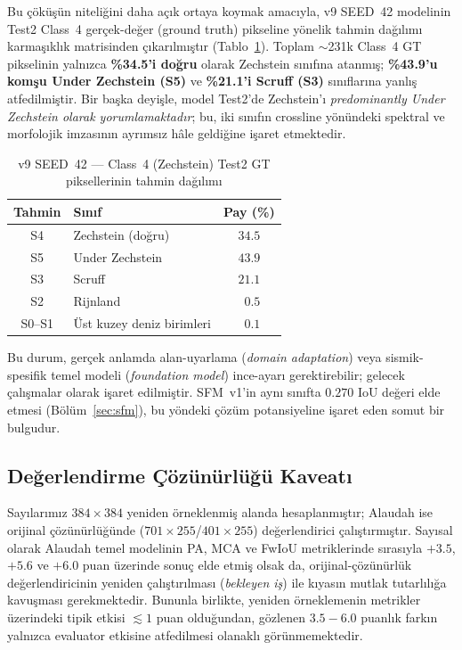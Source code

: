 \documentclass[conference,a4paper,10pt]{IEEEtran}
\begin{document}
Bu çöküşün niteliğini daha açık ortaya koymak amacıyla, v9 SEED~42 modelinin
Test2 Class~4 gerçek-değer (ground truth) pikseline yönelik tahmin dağılımı
karmaşıklık matrisinden çıkarılmıştır (Tablo~\ref{tab:c4_confusion}). Toplam
$\sim$231k Class~4 GT pikselinin yalnızca \textbf{\%34.5'i doğru} olarak
Zechstein sınıfına atanmış; \textbf{\%43.9'u komşu Under Zechstein (S5)}
ve \textbf{\%21.1'i Scruff (S3)} sınıflarına yanlış atfedilmiştir. Bir başka
deyişle, model Test2'de Zechstein'ı \emph{predominantly Under Zechstein
olarak yorumlamaktadır}; bu, iki sınıfın crossline yönündeki spektral ve
morfolojik imzasının ayrımsız hâle geldiğine işaret etmektedir.

\begin{table}[!t]
\renewcommand{\arraystretch}{1.2}
\caption{v9 SEED~42 --- Class~4 (Zechstein) Test2 GT piksellerinin tahmin dağılımı}
\label{tab:c4_confusion}
\centering
\begin{tabular}{clc}
\toprule
\textbf{Tahmin} & \textbf{Sınıf} & \textbf{Pay (\%)} \\
\midrule
\rowcolor{green!10}
S4 & Zechstein (doğru)       & $\mathbf{34.5}$ \\
S5 & Under Zechstein         & $43.9$ \\
S3 & Scruff                  & $21.1$ \\
S2 & Rijnland                & $\phantom{0}0.5$ \\
S0--S1 & Üst kuzey deniz birimleri & $\phantom{0}0.1$ \\
\bottomrule
\end{tabular}
\end{table}

Bu durum, gerçek anlamda alan-uyarlama (\emph{domain adaptation}) veya
sismik-spesifik temel modeli (\emph{foundation model}) ince-ayarı
gerektirebilir; gelecek çalışmalar olarak işaret edilmiştir. SFM~v1'in
aynı sınıfta $0.270$ IoU değeri elde etmesi (Bölüm~\ref{sec:sfm}), bu
yöndeki çözüm potansiyeline işaret eden somut bir bulgudur.

\subsection{Değerlendirme Çözünürlüğü Kaveatı}

Sayılarımız $384\times 384$ yeniden örneklenmiş alanda hesaplanmıştır; Alaudah
ise orijinal çözünürlüğünde ($701\times 255$/$401\times 255$) değerlendirici
çalıştırmıştır. Sayısal olarak Alaudah temel modelinin PA, MCA ve FwIoU
metriklerinde sırasıyla $+3.5$, $+5.6$ ve $+6.0$ puan üzerinde sonuç
elde etmiş olsak da, orijinal-çözünürlük değerlendiricinin yeniden
çalıştırılması (\emph{bekleyen iş}) ile kıyasın mutlak tutarlılığa
kavuşması gerekmektedir. Bununla birlikte, yeniden örneklemenin metrikler
üzerindeki tipik etkisi $\lesssim 1$ puan olduğundan, gözlenen $3.5{-}6.0$
puanlık farkın yalnızca evaluator etkisine atfedilmesi olanaklı görünmemektedir.
\end{document}
